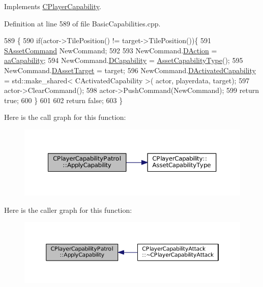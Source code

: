 Implements \hyperlink{classCPlayerCapability_a2ca6fd7fbd9c0178f1cf1d049c63825f}{C\+Player\+Capability}.



Definition at line 589 of file Basic\+Capabilities.\+cpp.


\begin{DoxyCode}
589                                                                                                            
                                                          \{
590     \textcolor{keywordflow}{if}(actor->TilePosition() != target->TilePosition())\{
591         \hyperlink{structSAssetCommand}{SAssetCommand} NewCommand;
592         
593         NewCommand.\hyperlink{structSAssetCommand_a8edd3b3d59a76d5514ba403bc8076a75}{DAction} = \hyperlink{GameDataTypes_8h_ab47668e651a3032cfb9c40ea2d60d670acf9fb164e8abd71c71f4a8c7fda360d4}{aaCapability};
594         NewCommand.\hyperlink{structSAssetCommand_a734ea7c6847457b437360f333f570ff9}{DCapability} = \hyperlink{classCPlayerCapability_a433bb196cd6ab6a932f1cac102b3aa98}{AssetCapabilityType}();
595         NewCommand.\hyperlink{structSAssetCommand_a3d9b43f6e59c386c48c41a65448a0c39}{DAssetTarget} = target;
596         NewCommand.\hyperlink{structSAssetCommand_ad8beda19520811cc70fe1eab16c774dd}{DActivatedCapability} = std::make\_shared< CActivatedCapability >(
      actor, playerdata, target);
597         actor->ClearCommand();
598         actor->PushCommand(NewCommand);
599         \textcolor{keywordflow}{return} \textcolor{keyword}{true};
600     \}
601 
602     \textcolor{keywordflow}{return} \textcolor{keyword}{false};
603 \}
\end{DoxyCode}
Here is the call graph for this function\+:
\nopagebreak
\begin{figure}[H]
\begin{center}
\leavevmode
\includegraphics[width=350pt]{classCPlayerCapabilityPatrol_a6b9e361d99e256efadcd99a829f93f51_cgraph}
\end{center}
\end{figure}
Here is the caller graph for this function\+:
\nopagebreak
\begin{figure}[H]
\begin{center}
\leavevmode
\includegraphics[width=350pt]{classCPlayerCapabilityPatrol_a6b9e361d99e256efadcd99a829f93f51_icgraph}
\end{center}
\end{figure}
